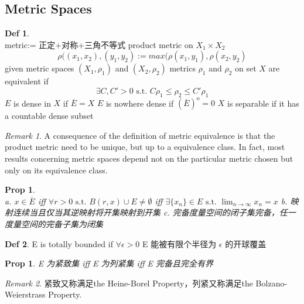 \documentclass[hidelinks]{article}
\theoremstyle{definition}
\newtheorem*{defin}{Def}
\theoremstyle{plain}
\newtheorem{proposition}[theorem]{Prop}
\theoremstyle{remark}
\newtheorem*{remark}{Remark}
\begin{document}
\subsection{Metric Spaces}
\begin{defin}~\\
metric:= 正定+对称+三角不等式 \newline
product metric on $X_1\times X_2$
$$\rho((x_1, x_2),(y_1, y_2):=max(\rho(x_1,y_1),\rho(x_2,y_2)$$
given metric spaces $(X_1,\rho_1)$ and $(X_2,\rho_2)$ \newline
metrics $\rho_1$ and $\rho_2$ on set $X$ are equivalent if
\[
\exists C,C'>0 \textrm{ s.t. } C\rho_1\leq \rho_2\leq C'\rho_1
\]
$E$ is dense in $X$ if $\overline{E}=X$ \newline
$E$ is nowhere dense if $(\overline{E})^{\mathrm{o}}=0$ \newline
$X$ is separable if it has a countable dense subset
\end{defin}

\begin{remark}
A consequence of the definition of metric equivalence is that the product metric need to be unique, but up to a equivalence class. In fact, most results concerning metric spaces depend not on the particular metric chosen but only on its equivalence class.
\end{remark}

\begin{proposition} \label{Prop 0.10}~\\
a. $x\in \overline{E}$ \textrm{ iff } $\forall r>0 \textrm{ s.t. } B(r,x)\cup E\neq \emptyset$ \textrm{ iff } $\exists \{x_n\}\in E\textrm{ s.t. }\lim_{n\to \infty}x_n=x$ \newline
b. 映射连续当且仅当其逆映射将开集映射到开集 \newline
c. 完备度量空间的闭子集完备，任一度量空间的完备子集为闭集
\end{proposition}

\begin{defin}
E is totally bounded if $\forall \epsilon >0$ E 能被有限个半径为 $\epsilon$ 的开球覆盖 \newline
\end{defin}

\begin{proposition} \label{Prop 0.11}
E 为紧致集 \textrm{iff} E 为列紧集 \textrm{iff} E 完备且完全有界
\end{proposition}

\begin{remark}
紧致又称满足the Heine-Borel Property，列紧又称满足the Bolzano-Weierstrass Property.
\end{remark}
\end{document}
